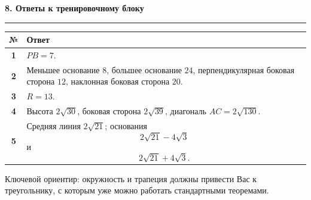 \documentclass[a4paper,12pt]{article}
\newcommand{\Section}[1]{%
    \vspace{0.4em}%
    {\Large\bfseries\color{darkaccent}#1}\par
    \vspace{0.25em}
    \noindent
    \textcolor{linegray}{\rule{\linewidth}{0.6pt}}
    \vspace{0.5em}%
}
\begin{document}
\clearpage

\Section{8. Ответы к тренировочному блоку}

\renewcommand{\arraystretch}{1.35}

\begin{table}[ht]

\centering

\begin{tabularx}{\linewidth}{@{}>{\bfseries}c X@{}}

\toprule
№ & Ответ \\
\midrule

1 &
$PB=7$.
\\

2 &
Меньшее основание $8$,
большее основание $24$,
перпендикулярная боковая сторона $12$,
наклонная боковая сторона $20$.
\\

3 &
$R=13$.
\\

4 &
Высота
$2\sqrt{30}$,
боковая сторона
$2\sqrt{39}$,
диагональ
$AC=2\sqrt{130}$.
\\

5 &
Средняя линия
$2\sqrt{21}$;
основания
\[
2\sqrt{21}-4\sqrt3
\]
и
\[
2\sqrt{21}+4\sqrt3.
\]
\\

\bottomrule

\end{tabularx}

\end{table}

\vfill

\begin{center}
\textcolor{softgray}{\small
Ключевой ориентир:
окружность и трапеция должны привести Вас
к треугольнику,
с которым уже можно работать
стандартными теоремами.
}
\end{center}
\end{document}
